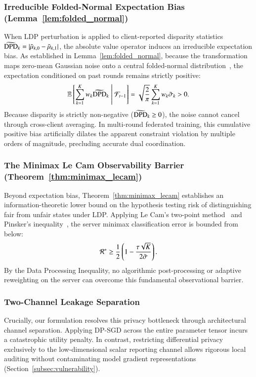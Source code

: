 \subsubsection{Irreducible Folded-Normal Expectation Bias (Lemma~\ref{lem:folded_normal})}
When LDP perturbation is applied to client-reported disparity statistics $\widetilde{\mathrm{DPD}}_k = |\tilde\mu_{k,0} - \tilde\mu_{k,1}|$, the absolute value operator induces an irreducible expectation bias. As established in Lemma~\ref{lem:folded_normal}, because the transformation maps zero-mean Gaussian noise onto a central folded-normal distribution~\citep{leone1961folded}, the expectation conditioned on past rounds remains strictly positive:
\begin{equation}
\mathbb{E}\left[ \sum_{k=1}^K w_k \widetilde{\mathrm{DPD}}_k \;\middle|\; \mathcal{F}_{t-1} \right] = \sqrt{\frac{2}{\pi}} \sum_{k=1}^K w_k \tilde{\sigma}_k > 0.
\end{equation}
Because disparity is strictly non-negative ($\widetilde{\mathrm{DPD}}_k \ge 0$), the noise cannot cancel through cross-client averaging. In multi-round federated training, this cumulative positive bias artificially dilates the apparent constraint violation by multiple orders of magnitude, precluding accurate dual coordination.

\subsubsection{The Minimax Le Cam Observability Barrier (Theorem~\ref{thm:minimax_lecam})}
Beyond expectation bias, Theorem~\ref{thm:minimax_lecam} establishes an information-theoretic lower bound on the hypothesis testing risk of distinguishing fair from unfair states under LDP. Applying Le Cam's two-point method~\citep{lecam1973convergence} and Pinsker's inequality~\citep{tsybakov2009nonparametric}, the server minimax classification error is bounded from below:
\begin{equation}
\mathcal{R}^* \ge \frac{1}{2}\left(1 - \frac{\tau\sqrt{K}}{2\tilde\sigma}\right).
\end{equation}
By the Data Processing Inequality, no algorithmic post-processing or adaptive reweighting on the server can overcome this fundamental observational barrier.

\subsubsection{Two-Channel Leakage Separation}
Crucially, our formulation resolves this privacy bottleneck through architectural channel separation. Applying DP-SGD across the entire parameter tensor incurs a catastrophic utility penalty. In contrast, restricting differential privacy exclusively to the low-dimensional scalar reporting channel allows rigorous local auditing without contaminating model gradient representations (Section~\ref{subsec:vulnerability}).

